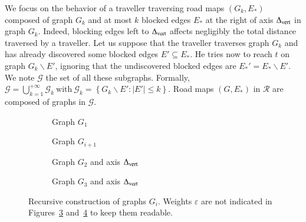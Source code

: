 \documentclass[preprint]{elsarticle}
\newcommand{\set}[1]{\left\{ #1 \right\}}
\newcommand{\card}[1]{\left| #1 \right|}
\newcommand{\mcalg}{\mathcal{G}}
\newcommand{\mcalr}{\mathcal{R}}
\newcommand{\deltavert}{\Delta_{\mbox{\scriptsize{vert}}}}
\begin{document}

We focus on the behavior of a traveller traversing road maps $\left(G_k,E_*\right)$ composed of graph $G_k$ and at most $k$ blocked edges $E_*$ at the right of axis $\deltavert$ in graph $G_k$. Indeed, blocking edges left to $\deltavert$ affects negligibly the total distance traversed by a traveller. Let us suppose that the traveller traverses graph $G_k$ and has already discovered some blocked edges $E' \subseteq E_*$. He tries now to reach $t$ on graph $G_k\backslash E'$, ignoring that the undiscovered blocked edges are $E_*' = E_* \backslash E'$.
We note $\mcalg$ the set of all these subgraphs. Formally, $\mcalg = \bigcup_{k=1}^{+\infty} \mcalg_k ~\mbox{with}~
\mcalg_k = \set{G_k\backslash E' : \card{E'} \leq k}$. Road maps $\left(G,E_*\right)$ in $\mcalr$ are composed of graphs in $\mcalg$.

\begin{figure}[h]
\centering
\begin{subfigure}[b]{0.49\columnwidth}
\centering
\scalebox{.7}{}
\caption{Graph $G_1$}
\label{subfig:G_1}
\end{subfigure}
\begin{subfigure}[b]{0.49\columnwidth}
\centering
\scalebox{.52}{}
\caption{Graph $G_{i+1}$}
\label{subfig:G_i}
\end{subfigure}
\begin{subfigure}[b]{0.49\columnwidth}
\centering
\scalebox{.45}{}
\caption{Graph $G_2$ and axis $\deltavert$}
\label{subfig:G_2}
\end{subfigure}
\begin{subfigure}[b]{0.49\columnwidth}
\centering
\scalebox{0.45}{}
\caption{Graph $G_3$ and axis $\deltavert$}
\label{subfig:G_3}
\end{subfigure}
\caption{Recursive construction of graphs $G_i$. Weights $\varepsilon$ are not indicated in Figures~\ref{subfig:G_2} and~\ref{subfig:G_3} to keep them readable.}
\label{fig:G_i}
\end{figure}
\end{document}
